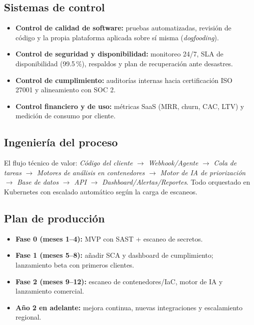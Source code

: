 \subsection{Sistemas de control}
\begin{itemize}
  \item \textbf{Control de calidad de software:} pruebas automatizadas, revisión de
        código y la propia plataforma aplicada sobre sí misma (\emph{dogfooding}).
  \item \textbf{Control de seguridad y disponibilidad:} monitoreo 24/7, SLA de
        disponibilidad (99.5\,\%), respaldos y plan de recuperación ante desastres.
  \item \textbf{Control de cumplimiento:} auditorías internas hacia certificación
        ISO 27001 y alineamiento con SOC 2.
  \item \textbf{Control financiero y de uso:} métricas SaaS (MRR, churn, CAC, LTV) y
        medición de consumo por cliente.
\end{itemize}

\subsection{Ingeniería del proceso}
El flujo técnico de valor: \emph{Código del cliente $\rightarrow$ Webhook/Agente
$\rightarrow$ Cola de tareas $\rightarrow$ Motores de análisis en contenedores
$\rightarrow$ Motor de IA de priorización $\rightarrow$ Base de datos $\rightarrow$ API
$\rightarrow$ Dashboard/Alertas/Reportes}. Todo orquestado en Kubernetes con escalado
automático según la carga de escaneos.

\subsection{Plan de producción}
\begin{itemize}
  \item \textbf{Fase 0 (meses 1--4):} MVP con SAST + escaneo de secretos.
  \item \textbf{Fase 1 (meses 5--8):} añadir SCA y dashboard de cumplimiento;
        lanzamiento beta con primeros clientes.
  \item \textbf{Fase 2 (meses 9--12):} escaneo de contenedores/IaC, motor de IA y
        lanzamiento comercial.
  \item \textbf{Año 2 en adelante:} mejora continua, nuevas integraciones y
        escalamiento regional.
\end{itemize}

